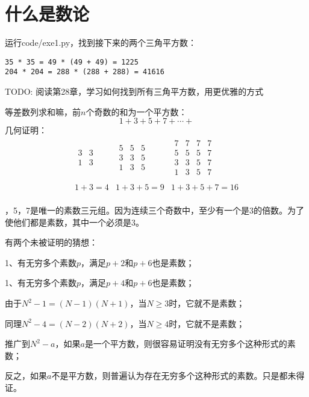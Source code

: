 \chapter{什么是数论}
\exercise
运行code/exe1.py，找到接下来的两个三角平方数：
\begin{verbatim}
35 * 35 = 49 * (49 + 49) = 1225
204 * 204 = 288 * (288 + 288) = 41616
\end{verbatim}
TODO: 阅读第28章，学习如何找到所有三角平方数，用更优雅的方式

\exercise
等差数列求和嘛，前$n$个奇数的和为一个平方数：
\[1+3+5+7+\cdots+\]
几何证明：
\[
    \begin{array}{ccc}
        \begin{array}{cc}
            3 & 3 \\
            1 & 3 \\
        \end{array} &
        \begin{array}{ccc}
            5 & 5 & 5 \\
            3 & 3 & 5 \\
            1 & 3 & 5 \\
        \end{array} &
        \begin{array}{cccc}
            7 & 7 & 7 & 7 \\
            5 & 5 & 5 & 7 \\
            3 & 3 & 5 & 7 \\
            1 & 3 & 5 & 7 \\
        \end{array} \\

        1 + 3 = 4 &
        1 + 3 + 5 = 9 &
        1 + 3 + 5 + 7 = 16 \\
    \end{array}
\]

，5，7是唯一的素数三元组。因为连续三个奇数中，至少有一个是3的倍数。为了使他们都是素数，其中一个必须是3。\par
有两个未被证明的猜想：\par
1、有无穷多个素数$p$，满足$p+2$和$p+6$也是素数；\par
1、有无穷多个素数$p$，满足$p+4$和$p+6$也是素数；

\exercise
由于$N^2-1=(N-1)(N+1)$，当$N\ge3$时，它就不是素数；\par
同理$N^2-4=(N-2)(N+2)$，当$N\ge4$时，它就不是素数；\par
推广到$N^2-a$，如果$a$是一个平方数，则很容易证明没有无穷多个这种形式的素数；\par
反之，如果$a$不是平方数，则普遍认为存在无穷多个这种形式的素数。只是都未得证。

